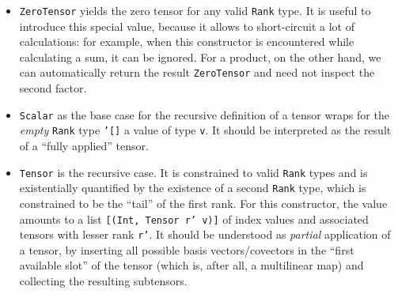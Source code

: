 \begin{itemize}
  \item \texttt{ZeroTensor} yields the zero tensor for any valid \texttt{Rank} type. It is useful to introduce this special value, because it allows to short-circuit a lot of calculations: for example, when this constructor is encountered while calculating a sum, it can be ignored. For a product, on the other hand, we can automatically return the result \texttt{ZeroTensor} and need not inspect the second factor.
  \item \texttt{Scalar} as the base case for the recursive definition of a tensor wraps for the \emph{empty} \texttt{Rank} type \texttt{'[]} a value of type \texttt{v}. It should be interpreted as the result of a ``fully applied'' tensor.
  \item \texttt{Tensor} is the recursive case. It is constrained to valid \texttt{Rank} types and is existentially quantified by the existence of a second \texttt{Rank} type, which is constrained to be the ``tail'' of the first rank. For this constructor, the value amounts to a list \texttt{[(Int, Tensor r' v)]} of index values and associated tensors with lesser rank \texttt{r'}. It should be understood as \emph{partial} application of a tensor, by inserting all possible basis vectors/covectors in the ``first available slot'' of the tensor (which is, after all, a multilinear map) and collecting the resulting subtensors.
\end{itemize}

